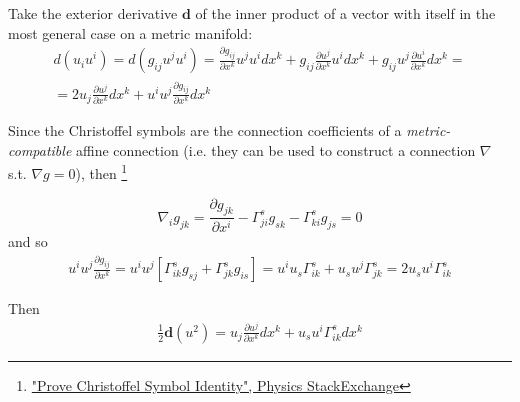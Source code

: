\documentclass[twoside,landscape,10pt]{amsart}
\theoremstyle{plain}
\theoremstyle{definition}
\theoremstyle{remark}
\theoremstyle{remark}
\begin{document}
\begin{multicols*}{2}

Take the exterior derivative $\mathbf{d}$ of the inner product of a vector with itself in the most general case on a metric manifold:
\[
\begin{gathered}
d(u_i u^i) = d(g_{ij} u^j u^i) = \frac{ \partial g_{ij} }{ \partial x^k} u^j u^i dx^k  + g_{ij} \frac{ \partial u^j}{ \partial x^k} u^i dx^k + g_{ij} u^j \frac{\partial u^i}{\partial x^k} dx^k = \\
= 2 u_j \frac{ \partial u^j}{\partial x^k} dx^k + u^i u^j \frac{\partial g_{ij}}{\partial x^k} dx^k 
\end{gathered}
\]


Since the Christoffel symbols are the connection coefficients of a \emph{metric-compatible} affine connection (i.e. they can be used to construct a connection $\nabla$ s.t. $\nabla g = 0$), then \footnote{ \href{https://physics.stackexchange.com/questions/175235/prove-christoffel-symbol-identity}{"Prove Christoffel Symbol Identity", Physics StackExchange}}

\begin{equation}
\nabla_i g_{jk} = \frac{ \partial g_{jk}}{\partial x^i} - \Gamma^s_{ji} g_{sk} - \Gamma^s_{ki} g_{js} = 0
\end{equation}
and so
\begin{equation}
\begin{gathered}
u^i u^j \frac{ \partial g_{ij}}{\partial x^k} = u^i u^j \left[ \Gamma^s_{ik} g_{sj} + \Gamma^s_{jk} g_{is} \right] = u^i u_s \Gamma^s_{ik} + u_s u^j \Gamma^s_{jk} = 2u_s u^i \Gamma^s_{ik}
\end{gathered}
\end{equation}


Then 
\begin{equation}\label{Eq:ExteriorDerivativeOfMagnitudeSquareOfVector}
\begin{gathered}
\frac{1}{2} \mathbf{d}(u^2) = u_j \frac{ \partial u^j}{\partial x^k} dx^k + u_s u^i \Gamma^s_{ik} dx^k
\end{gathered}
\end{equation}


\end{multicols*}
\end{document}
